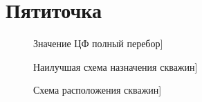 \documentclass[14pt]{article}
\begin{document}
	\section{Пятиточка}
\begin{figure}
		\caption{Значение ЦФ полный перебор]}
		\label{fig:map}
\end{figure}
\begin{figure}
	\caption{Наилучшая схема назначения скважин]}
	\label{fig:map}
\end{figure}
\begin{figure}
	\caption{Схема расположения скважин]}
	\label{fig:map}
\end{figure}
\end{document}
